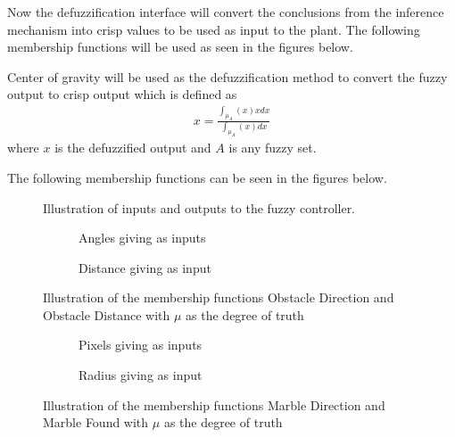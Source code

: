 \documentclass[../Head/Main.tex]{subfiles}
\begin{document}
Now the defuzzification interface will convert the conclusions from the inference mechanism into crisp values to be used as input to the plant. The following membership functions will be used as seen in the figures below.  


Center of gravity will be used as the defuzzification method to convert the fuzzy output to crisp output which is defined as
\begin{align}
 x = \frac{ \int_{\mu_A}(x)xdx }{ \int_{\mu_A} (x) dx }
\end{align}  
where $x$ is the defuzzified output and $A$ is any fuzzy set.\par
The following membership functions can be seen in the figures below.  

\begin{figure}[H]
	\centering
	
	\caption{Illustration of inputs and outputs to the fuzzy controller.}
	\label{fig:MSF_Overview}
\end{figure}

\begin{figure}[H]
	\centering
	\begin{subfigure}[b]{0.49\textwidth}
		\centering
		
		\caption{Angles giving as inputs}
		\label{fig:MSF_Obstacle_direction}
	\end{subfigure}
	\hfill
	\begin{subfigure}[b]{0.49\textwidth}
		
		\vspace{-17pt}
		\caption{Distance giving as input}
		\label{fig:MSF_Obstacle_distance}
	\end{subfigure}
	\caption{Illustration of the membership functions Obstacle Direction and Obstacle Distance with $\mu$ as the degree of truth}
	\label{fig:MSF_Obstacle_dir_dis}
\end{figure}

\begin{figure}[H]
	\centering
	\begin{subfigure}[b]{0.49\textwidth}
		\centering
		
		\caption{Pixels giving as inputs }
		\label{fig:MSF_Marble_direction}
	\end{subfigure}
	\hfill
	\begin{subfigure}[b]{0.49\textwidth}
		
		\caption{Radius giving as input}
		\label{fig:MSF_Marble_found}
	\end{subfigure}
	\caption{Illustration of the membership functions Marble Direction and Marble Found with $\mu$ as the degree of truth}
	\label{fig:MSF_Marble}
\end{figure}
\end{document}

